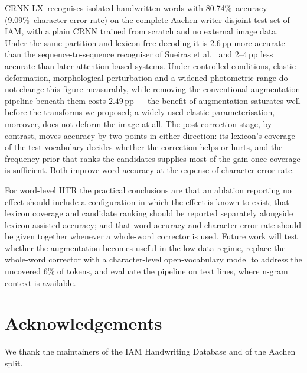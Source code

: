 \documentclass[conference]{IEEEtran}
\newcommand{\ours}{CRNN-LX}            %
\newcommand{\ourwa}{80.74\%}
\newcommand{\ourcer}{9.09\%}
\begin{document}
\ours\ recognises isolated handwritten words with \ourwa\ accuracy
(\ourcer\ character error rate) on the complete Aachen writer-disjoint
test set of IAM, with a plain CRNN trained from scratch and no external
image data. Under the same partition and lexicon-free decoding it is
2.6\,pp more accurate than the sequence-to-sequence recogniser of
Sueiras et al.~\cite{sueiras2018offline} and 2--4\,pp less accurate
than later attention-based systems. Under controlled conditions, elastic deformation,
morphological perturbation and a widened photometric range do not
change this figure measurably, while removing the conventional
augmentation pipeline beneath them costs $2.49$\,pp --- the benefit of
augmentation saturates well before the transforms we proposed; a
widely used elastic parameterisation, moreover, does not deform the
image at all. The post-correction stage, by
contrast, moves accuracy by two points in either direction: its
lexicon's coverage of the test vocabulary decides whether the
correction helps or hurts, and the frequency prior that ranks the
candidates supplies most of the gain once coverage is sufficient.
Both improve word accuracy at the expense of character error rate.

For word-level HTR the practical conclusions are that an ablation
reporting no effect should include a configuration in which the effect
is known to exist; that lexicon coverage and candidate ranking should
be reported separately alongside lexicon-assisted accuracy; and that
word accuracy and character error rate should be given together
whenever a whole-word corrector is used. Future work
will test whether the augmentation becomes useful in the low-data
regime, replace the whole-word corrector with a character-level
open-vocabulary model to address the uncovered 6\% of tokens, and
evaluate the pipeline on text lines, where n-gram context is
available.

\section*{Acknowledgements}
We thank the maintainers of the IAM Handwriting Database and of the
Aachen split.



\end{document}
